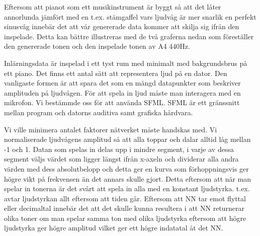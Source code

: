 \documentclass[a4paper,10pt]{article}
\begin{document}
Eftersom att pianot som ett musikinstrument är byggt så att det låter annorlunda jämfört med en t.ex. stämgaffel vars ljudvåg är mer snarlik en perfekt sinusvåg innebär det att vår genererade data kommer att skilja sig ifrån den inspelade. Detta kan bättre illustreras med de två graferna nedan som föreställer den genererade tonen och den inspelade tonen av A4 440Hz. 
\begin{figure}[ht]
\end{figure}

Inlärningsdata är inspelad i ett tyst rum med minimalt med bakgrundsbrus på ett piano. 
Det finns ett antal sätt att representera ljud på en dator. Den vanligaste formen är att spara det som en mängd datapunkter som beskriver amplituden på ljudvågen.
För att spela in ljud måste man interagera med en mikrofon. Vi bestämmde oss för att använda SFML. SFML är ett gränssnitt mellan program och datorns auditiva samt grafiska hårdvara. 

Vi ville minimera antalet faktorer nätverket måste handskas med. Vi normaliserade ljudvågens amplitud så att alla toppar och dalar alltid låg mellan -1 och 1. Datan som spelas in delas upp i mindre segment, i varje av dessa segment väljs värdet som ligger längst ifrån x-axeln och dividerar alla andra värden med dess absolutbelopp och detta ger en kurva som förhoppningsvis ger högre vikt på frekvensen än det annars skulle gjort. Detta eftersom att när man spelar in tonerna är det svårt att spela in alla med en konstant ljudstyrka. t.ex. avtar ljudstyrkan allt eftersom att tiden går. Eftersom att NN tar emot flyttal eller decimaltal innebär det att det skulle kunna resultera i att NN returnerar olika toner om man spelar samma ton med olika ljudstyrka eftersom att högre ljudstyrka ger högre amplitud vilket ger ett högre indatatal åt det NN.
\end{document}
